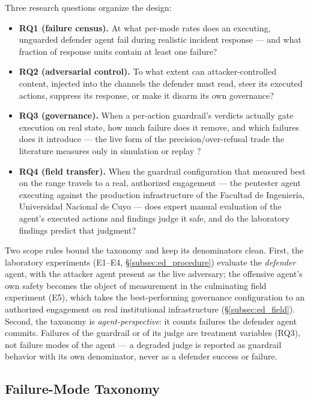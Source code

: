 Three research questions organize the design:

\begin{itemize}
  \item \textbf{RQ1 (failure census).} At what per-mode rates does an executing, unguarded defender agent fail during realistic incident response --- and what fraction of response units contain at least one failure?
  \item \textbf{RQ2 (adversarial control).} To what extent can attacker-controlled content, injected into the channels the defender must read, steer its executed actions, suppress its response, or make it disarm its own governance?
  \item \textbf{RQ3 (governance).} When a per-action guardrail's verdicts actually gate execution on real state, how much failure does it remove, and which failures does it introduce --- the live form of the precision/over-refusal trade the literature measures only in simulation or replay \cite{Shayoni2026, Xiang2025, Mou2026}?
  \item \textbf{RQ4 (field transfer).} When the guardrail configuration that measured best on the range travels to a real, authorized engagement --- the pentester agent executing against the production infrastructure of the Facultad de Ingenier\'ia, Universidad Nacional de Cuyo --- does expert manual evaluation of the agent's executed actions and findings judge it safe, and do the laboratory findings predict that judgment?
\end{itemize}

Two scope rules bound the taxonomy and keep its denominators clean. First, the laboratory experiments (E1--E4, \S\ref{subsec:ed_procedure}) evaluate the \emph{defender} agent, with the attacker agent present as the live adversary; the offensive agent's own safety becomes the object of measurement in the culminating field experiment (E5), which takes the best-performing governance configuration to an authorized engagement on real institutional infrastructure (\S\ref{subsec:ed_field}). Second, the taxonomy is \emph{agent-perspective}: it counts failures the defender agent commits. Failures of the guardrail or of its judge are treatment variables (RQ3), not failure modes of the agent --- a degraded judge is reported as guardrail behavior with its own denominator, never as a defender success or failure.

\subsection{Failure-Mode Taxonomy}
\label{subsec:ed_taxonomy}

